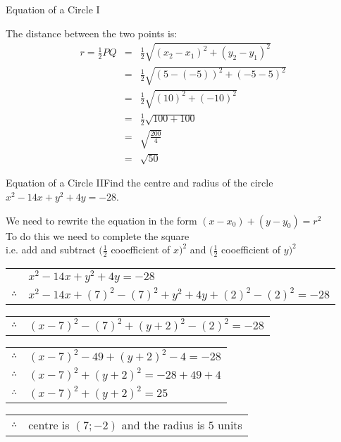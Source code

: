\begin{wex}{Equation of a Circle I}
{The distance between the two points is:
\begin{eqnarray*}
r=\frac{1}{2}PQ &=& \frac{1}{2}\sqrt{(x_2-x_1)^2+(y_2-y_1)^2}\\
&=& \frac{1}{2}\sqrt{(5-(-5))^2+(-5-5)^2}\\
&=& \frac{1}{2}\sqrt{(10)^2+(-10)^2}\\
&=& \frac{1}{2}\sqrt{100+100}\\
&=& \sqrt{\frac{200}{4}}\\
&=& \sqrt{50}
\end{eqnarray*}

}
\end{wex}

\begin{wex}{Equation of a Circle II}{Find the centre and radius of the circle \\ $x^2 - 14 x + y^2 + 4y = -28$.}{
We need to rewrite the equation in the form  $(x - x_0) + (y - y_0) = r^2$ \\
To do this we need to complete the square \\
i.e.\@{} add and subtract $(\frac{1}{2}$ cooefficient of $x)^2$ and $(\frac{1}{2}$ cooefficient of $y)^2$ \\

\begin{tabular}{ll}
& $x^2 - 14 x + y^2 + 4y = -28$ \\
$\therefore$ & $x^2 - 14 x + (7)^2 -(7)^2 + y^2 + 4y + (2)^2 -(2)^2 = -28$ \\
\end{tabular}

\begin{tabular}{ll}
$\therefore$ & $(x - 7)^2 -(7)^2 + (y + 2)^2 -(2)^2 = -28$ \\
\end{tabular}

\begin{tabular}{ll}
$\therefore$ & $(x - 7)^2 -49 + (y + 2)^2 -4 = -28$ \\
$\therefore$ & $(x - 7)^2 + (y + 2)^2 = -28 + 49 + 4$ \\ 
$\therefore$ & $(x - 7)^2 + (y + 2)^2 = 25$ \\
\end{tabular}

\begin{tabular}{ll}
$\therefore$ & centre is $ (7;-2)$ and the radius is $5$ units
\end{tabular}
}
\end{wex}

